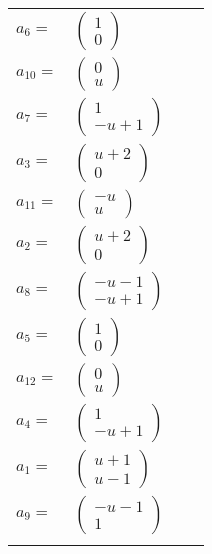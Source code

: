 \documentclass[1p]{elsarticle_modified}
\theoremstyle{definition}
\begin{document}
\begin{tabular}{m{7pt} m{180pt} m{7pt} m{180pt} }
\flushright $a_{6}=$&$\begin{pmatrix}1\\0\end{pmatrix}$ \\
\flushright $a_{10}=$&$\begin{pmatrix}0\\u\end{pmatrix}$ \\
\flushright $a_{7}=$&$\begin{pmatrix}1\\- u+1\end{pmatrix}$ \\
\flushright $a_{3}=$&$\begin{pmatrix}u+2\\0\end{pmatrix}$ \\
\flushright $a_{11}=$&$\begin{pmatrix}- u\\u\end{pmatrix}$ \\
\flushright $a_{2}=$&$\begin{pmatrix}u+2\\0\end{pmatrix}$ \\
\flushright $a_{8}=$&$\begin{pmatrix}- u-1\\- u+1\end{pmatrix}$ \\
\flushright $a_{5}=$&$\begin{pmatrix}1\\0\end{pmatrix}$ \\
\flushright $a_{12}=$&$\begin{pmatrix}0\\u\end{pmatrix}$ \\
\flushright $a_{4}=$&$\begin{pmatrix}1\\- u+1\end{pmatrix}$ \\
\flushright $a_{1}=$&$\begin{pmatrix}u+1\\u-1\end{pmatrix}$ \\
\flushright $a_{9}=$&$\begin{pmatrix}- u-1\\1\end{pmatrix}$\\&\end{tabular}
\end{document}
